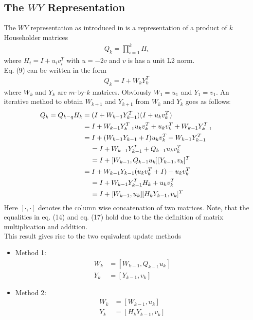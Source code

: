 \documentclass{article}
\begin{document}
\subsection{The $WY$ Representation}\label{sec_wy}
The $WY$ representation as introduced in \cite{WY} is a representation of a product of $k$ Householder matrices
\begin{align}
	Q_k = \prod_{i=1}^kH_i
\end{align}
where $H_i=I + u_iv_i^T$ with $u=-2v$ and $v$ is has a unit L2 norm.\\
Eq. (9) can be written in the form 
\begin{align}
Q_k = I + W_kY_k^T
\end{align}
where $W_k$ and $Y_k$ are $m$-by-$k$ matrices. Obviously $W_1=u_1$ and $Y_1=v_1$. An iterative method to obtain $W_{k+1}$ and $Y_{k+1}$ from $W_k$ and $Y_k$ goes as follows:\\
\begin{align}
	Q_k = Q_{k-q}H_k &= (I + W_{k-1}Y_{k-1}^T)(I + u_kv_k^T) \\
	&= I + W_{k-1}Y_{k-1}^Tu_kv_k^T +u_kv_k^T + W_{k-1}Y_{k-1}^T\\
	&= I + (W_{k-1}Y_{k-1} + I)u_kv_k^T + W_{k-1}Y_{k-1}^T \\
	&\text{\hspace{4mm}} = I + W_{k-1}Y_{k-1}^T + Q_{k-1}u_kv_k^T \\
	&\text{\hspace{4mm}} = I + [W_{k-1}, Q_{k-1}u_k][Y_{k-1}, v_k]^T \\
	&= I + W_{k-1}Y_{k-1}(u_kv_k^T + I) + u_kv_k^T \\
	&\text{\hspace{4mm}} = I + W_{k-1}Y_{k-1}^T H_k + u_kv_k^T \\
	&\text{\hspace{4mm}} = I + [W_{k-1}, u_k][H_kY_{k-1}, v_k]^T
\end{align}
Here $[\cdot, \cdot]$ denotes the column wise concatenation of two matrices. Note, that the equalities in eq. (14) and eq. (17) hold due to the the definition of matrix multiplication and addition. \\
This result gives rise to the two equivalent update methods
\begin{itemize}
	\item Method 1:\\
		\begin{align}
			W_k &= [W_{k-1}, Q_{k-1}u_k]\\
			Y_k &= [Y_{k-1}, v_k]
		\end{align}
	\item Method 2:\\
		\begin{align}
			W_k &= [W_{k-1}, u_k]\\
			Y_k &= [H_kY_{k-1}, v_k]
		\end{align}
	\end{itemize}
\end{document}
